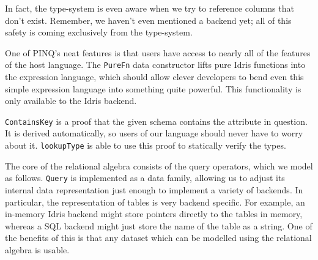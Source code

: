 \documentclass[12pt]{article}
\begin{document}
In fact, the type-system is even aware when we try to reference columns that don't exist.
Remember, we haven't even mentioned a backend yet; all of this safety is coming exclusively from the type-system.

One of PINQ's neat features is that users have access to nearly all of the features of the host language.
The \texttt{PureFn} data constructor lifts pure Idris functions into the expression language, which should allow clever developers to bend even this simple expression language into something quite powerful.
This functionality is only available to the Idris backend.

\texttt{ContainsKey} is a proof that the given schema contains the attribute in question.
It is derived automatically, so users of our language should never have to worry about it.
\texttt{lookupType} is able to use this proof to statically verify the types.

The core of the relational algebra consists of the query operators, which we model as follows.
\texttt{Query} is implemented as a data family, allowing us to adjust its internal data representation just enough to implement a variety of backends.
In particular, the representation of tables is very backend specific.
For example, an in-memory Idris backend might store pointers directly to the tables in memory, whereas a SQL backend might just store the name of the table as a string.
One of the benefits of this is that any dataset which can be modelled using the relational algebra is usable.
\end{document}
